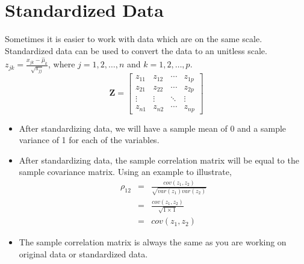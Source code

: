 \documentclass{article}
\begin{document}
\section{Standardized Data}
Sometimes it is easier to work with data which are on the same scale. Standardized data can be used to convert the data to an unitless scale.
$z_{jk}=\frac{x_{jk}-\hat{\mu}_k}{\sqrt{s_{jj}}}$, where $j = 1,2,\hdots,n$ and $k=1,2,\hdots,p$.
\[\mathbf{Z}=\begin{bmatrix}
z_{11} & z_{12} & \cdots & z_{1p}\\ 
z_{21} & z_{22} & \cdots & z_{2p} \\ 
\vdots & \vdots & \ddots & \vdots \\ 
z_{n1} & z_{n2} & \cdots & z_{np} 
\end{bmatrix}\]

\begin{itemize}
    \item After standardizing data, we will have a sample mean of 0 and a sample variance of 1 for each of the variables.
    \item After standardizing data, the sample correlation matrix will be equal to the sample covariance matrix. Using an example to illustrate,
    \begin{eqnarray*}
    \rho_{12} &=& \frac{cov(z_1,z_2)}{\sqrt{var(z_1)var(z_2)}}\\
              &=& \frac{cov(z_1,z_2)}{\sqrt{1\times1}}\\
              &=& cov(z_1,z_2)
    \end{eqnarray*}
    \item The sample correlation matrix is always the same as you are working on original data or standardized data.
\end{itemize}
\end{document}
